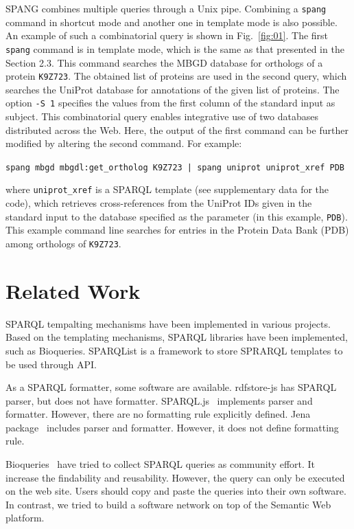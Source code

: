 \documentclass[runningheads]{llncs}
\begin{document}
SPANG combines multiple queries through a Unix pipe. 
Combining a {\tt spang} command in shortcut mode and another one in template mode is also possible.
An example of such a combinatorial query is shown in Fig.~\ref{fig:01}.
The first {\tt spang} command is in template mode, which is the same as that presented in the Section 2.3. 
This command searches the MBGD database for orthologs of a protein {\tt K9Z723}. 
The obtained list of proteins are used in the second query, which searches the UniProt database for annotations of the given list of proteins. 
The option \texttt{-S 1} specifies the values from the first column of the standard input as subject.
This combinatorial query enables integrative use of two databases distributed across the Web. 
Here, the output of the first command can be further modified by altering the second command.
For example:
\begin{quoting}
\texttt{spang mbgd mbgdl:get\_ortholog K9Z723 | spang uniprot uniprot\_xref PDB}
\vspace{1pt}
\end{quoting}
where {\tt uniprot\_xref} is a SPARQL template (see supplementary data for the code), which retrieves cross-references from the UniProt IDs given in the standard input to the database specified as the parameter (in this example, {\tt PDB}). This example command line searches for entries in the Protein Data Bank (PDB) \citep{Berman} among orthologs of {\tt K9Z723}.



\section{Related Work}

SPARQL tempalting mechanisms have been implemented in various projects. Based on the templating mechanisms, SPARQL libraries have been implemented, such as Bioqueries. SPARQList is a framework to store SPRARQL templates to be used through API.

As a SPARQL formatter, some software are available.
rdfstore-js\cite{rdfstore-js} has SPARQL parser, but does not have formatter.
SPARQL.js~\cite{sparql-js} implements parser and formatter. However, there are no formatting rule explicitly defined.
Jena package~\cite{jena} includes parser and formatter. However, it does not define formatting rule.

Bioqueries~\cite{bioqueries} have tried to collect SPARQL queries as community effort. It increase the findability and reusability.
However, the query can only be executed on the web site.
Users should copy and paste the queries into their own software.
In contrast, we tried to build a software network on top of the Semantic Web platform.
\end{document}

